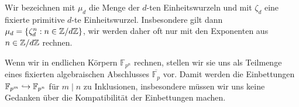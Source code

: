 Wir bezeichnen mit $\mu_d$ die Menge der $d$-ten Einheitswurzeln und mit $\zeta_d$ eine fixierte primitive $d$-te Einheitswurzel. Insbesondere gilt dann $\mu_d = \{ \zeta_d^n : n \in \Zmod dZ \}$, wir werden daher oft nur mit den Exponenten aus $n \in \Zmod dZ$ rechnen.

Wenn wir in endlichen Körpern $\mathbb F_{p^n}$ rechnen, stellen wir sie uns als Teilmenge eines fixierten algebraischen Abschlusses $\overline{\mathbb F_p}$ vor. Damit werden die Einbettungen $\mathbb F_{p^m} \hookrightarrow \mathbb F_{p^n}$ für $m \mid n$ zu Inklusionen, insbesondere müssen wir uns keine Gedanken über die Kompatibilität der Einbettungen machen.
